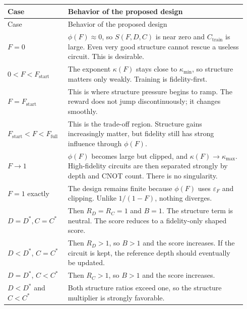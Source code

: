 \documentclass[11pt]{article}
\begin{document}
\begin{longtable}{>{\raggedright\arraybackslash}p{0.23\linewidth} >{\raggedright\arraybackslash}p{0.71\linewidth}}
\toprule
Case & Behavior of the proposed design \\
\midrule
\endfirsthead
\toprule
Case & Behavior of the proposed design \\
\midrule
\endhead
\midrule
\multicolumn{2}{r}{Continued on next page}
\endfoot
\bottomrule
\endlastfoot

$F=0$ &
$\phi(F)\approx 0$, so $S(F,D,C)$ is near zero and $C_{\mathrm{train}}$ is large.
Even very good structure cannot rescue a useless circuit. This is desirable. \\[4pt]

$0<F<F_{\mathrm{start}}$ &
The exponent $\kappa(F)$ stays close to $\kappa_{\min}$, so structure matters only weakly.
Training is fidelity-first. \\[4pt]

$F=F_{\mathrm{start}}$ &
This is where structure pressure begins to ramp.
The reward does not jump discontinuously; it changes smoothly. \\[4pt]

$F_{\mathrm{start}}<F<F_{\mathrm{full}}$ &
This is the trade-off region.
Structure gains increasingly matter, but fidelity still has strong influence through $\phi(F)$. \\[4pt]

$F\to 1$ &
$\phi(F)$ becomes large but clipped, and $\kappa(F)\to \kappa_{\max}$.
High-fidelity circuits are then separated strongly by depth and CNOT count.
There is no singularity. \\[4pt]

$F=1$ exactly &
The design remains finite because $\phi(F)$ uses $\varepsilon_F$ and clipping.
Unlike $1/(1-F)$, nothing diverges. \\[4pt]

$D=D^*, C=C^*$ &
Then $R_D=R_C=1$ and $B=1$.
The structure term is neutral.
The score reduces to a fidelity-only shaped score. \\[4pt]

$D<D^*$, $C=C^*$ &
Then $R_D>1$, so $B>1$ and the score increases.
If the circuit is kept, the reference depth should eventually be updated. \\[4pt]

$D=D^*$, $C<C^*$ &
Then $R_C>1$, so $B>1$ and the score increases. \\[4pt]

$D<D^*$ and $C<C^*$ &
Both structure ratios exceed one, so the structure multiplier is strongly favorable. \\[4pt]


\end{longtable}
\end{document}
